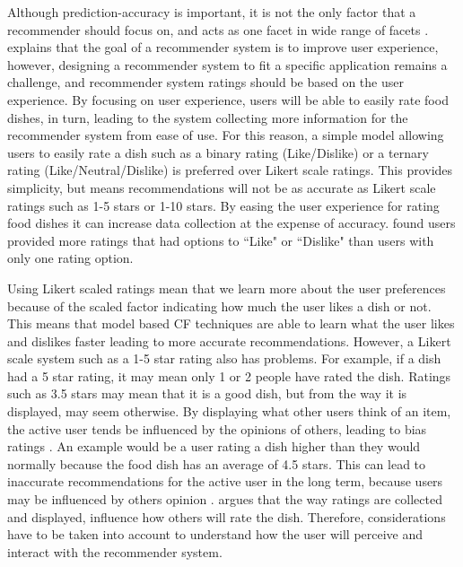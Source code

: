 Although prediction-accuracy is important, it is not the only factor that a recommender should focus on, and acts as one facet in wide range of facets \cite{martin2009recsys}. \citeauthor{martin2009recsys} \cite{martin2009recsys} explains that the goal of a recommender system is to improve user experience, however, designing a recommender system to fit a specific application remains a challenge, and recommender system ratings should be based on the user experience. By focusing on user experience, users will be able to easily rate food dishes, in turn, leading to the system collecting more information for the recommender system from ease of use. For this reason, a simple model allowing users to easily rate a dish such as a binary rating (Like/Dislike) or a ternary rating (Like/Neutral/Dislike) is preferred over Likert scale ratings. This provides simplicity, but means recommendations will not be as accurate as Likert scale ratings such as 1-5 stars or 1-10 stars. By easing the user experience for rating food dishes it can increase data collection at the expense of accuracy. \citeauthor{movieratings} \cite{schafer2007collaborative, moveratings} found users provided more ratings that had options to ``Like" or ``Dislike" than users with only one rating option. 

Using Likert scaled ratings mean that we learn more about the user preferences because of the scaled factor indicating how much the user likes a dish or not. This means that model based CF techniques are able to learn what the user likes and dislikes faster leading to more accurate recommendations. However, a Likert scale system such as a 1-5 star rating also has problems. For example, if a dish had a 5 star rating, it may mean only 1 or 2 people have rated the dish. Ratings such as 3.5 stars may mean that it is a good dish, but from the way it is displayed, may seem otherwise. By displaying what other users think of an item, the active user tends be influenced by the opinions of others, leading to bias ratings \cite{interface}. An example would be a user rating a dish higher than they would normally because the food dish has an average of 4.5 stars. This can lead to inaccurate recommendations for the active user in the long term, because users may be influenced by others opinion \cite{interface}. \citeauthor{interface} \cite{interface} argues that the way ratings are collected and displayed, influence how others will rate the dish. Therefore, considerations have to be taken into account to understand how the user will perceive and interact with the recommender system.  

